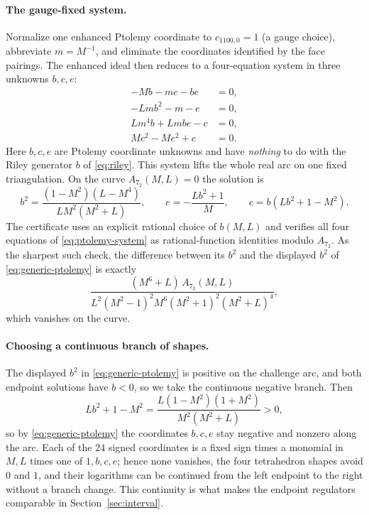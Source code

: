 \documentclass[11pt]{article}
\theoremstyle{definition}
\begin{document}
\paragraph{The gauge-fixed system.}
Normalize one enhanced Ptolemy coordinate to $c_{1100,0}=1$ (a gauge choice),
abbreviate $m=M^{-1}$, and eliminate the coordinates identified by the face
pairings.  The enhanced ideal then reduces to a four-equation system in three
unknowns $b,c,e$:
\begin{equation}\label{eq:ptolemy-system}
 \begin{split}
  -Mb-mc-be&=0,\\
  -Lmb^2-m-e&=0,\\
  Lm^4b+Lmbe-c&=0,\\
  Mc^2-Me^2+c&=0.
 \end{split}
\end{equation}
Here $b,c,e$ are Ptolemy coordinate unknowns and have \emph{nothing} to do with
the Riley generator $b$ of \eqref{eq:riley}.  This system lifts the whole real
arc on one fixed triangulation.  On the curve $A_{7_2}(M,L)=0$ the solution is
\begin{equation}\label{eq:generic-ptolemy}
 b^2=\frac{(1-M^2)(L-M^4)}{LM^2(M^2+L)},\qquad
 e=-\frac{Lb^2+1}{M},\qquad
 c=b(Lb^2+1-M^2).
\end{equation}
The certificate uses an explicit rational choice of $b(M,L)$ and verifies all
four equations of \eqref{eq:ptolemy-system} as rational-function identities
modulo $A_{7_2}$.  As the sharpest such check, the difference between its $b^2$
and the displayed $b^2$ of \eqref{eq:generic-ptolemy} is exactly
\[
 \frac{(M^6+L)\,A_{7_2}(M,L)}
 {L^2(M^2-1)^2M^6(M^2+1)^2(M^2+L)^4},
\]
which vanishes on the curve.

\paragraph{Choosing a continuous branch of shapes.}
The displayed $b^2$ in \eqref{eq:generic-ptolemy} is positive on the challenge
arc, and both endpoint solutions have $b<0$, so we take the continuous negative
branch.  Then
\[
 Lb^2+1-M^2=
 \frac{L(1-M^2)(1+M^2)}{M^2(M^2+L)}>0,
\]
so by \eqref{eq:generic-ptolemy} the coordinates $b,c,e$ stay negative and
nonzero along the arc.  Each of the $24$ signed coordinates is a fixed sign
times a monomial in $M,L$ times one of $1,b,c,e$; hence none vanishes, the four
tetrahedron shapes avoid $0$ and $1$, and their logarithms can be continued from
the left endpoint to the right without a branch change.  This continuity is what
makes the endpoint regulators comparable in Section~\ref{sec:interval}.
\end{document}
